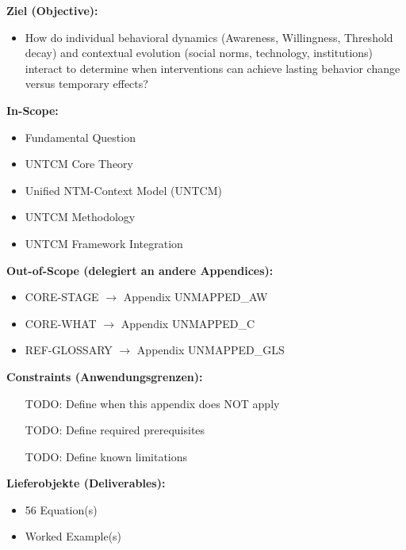 \begin{tcolorbox}[
    colback=orange!5!white,
    colframe=orange!75!black,
    title={\textbf{Appendix Scope: Ziel / In-Scope / Out-of-Scope / Constraints}},
    fonttitle=\bfseries
]

\textbf{Ziel (Objective):}
\begin{itemize}[nosep]
    \item How do individual behavioral dynamics (Awareness, Willingness, Threshold decay) and contextual evolution (social norms, technology, institutions) interact to determine when interventions can achieve lasting behavior change versus temporary effects?
\end{itemize}

\textbf{In-Scope:}
\begin{itemize}[nosep]
    \item Fundamental Question
    \item UNTCM Core Theory
    \item Unified NTM-Context Model (UNTCM)
    \item UNTCM Methodology
    \item UNTCM Framework Integration
\end{itemize}

\textbf{Out-of-Scope (delegiert an andere Appendices):}
\begin{itemize}[nosep]
    \item CORE-STAGE $\rightarrow$ Appendix UNMAPPED_AW
    \item CORE-WHAT $\rightarrow$ Appendix UNMAPPED_C
    \item REF-GLOSSARY $\rightarrow$ Appendix UNMAPPED_GLS
\end{itemize}

\textbf{Constraints (Anwendungsgrenzen):}
\begin{itemize}[nosep]
    \item [TODO: Define when this appendix does NOT apply]
    \item [TODO: Define required prerequisites]
    \item [TODO: Define known limitations]
\end{itemize}

\textbf{Lieferobjekte (Deliverables):}
\begin{itemize}[nosep]
    \item 56 Equation(s)
    \item Worked Example(s)
\end{itemize}

\end{tcolorbox}


